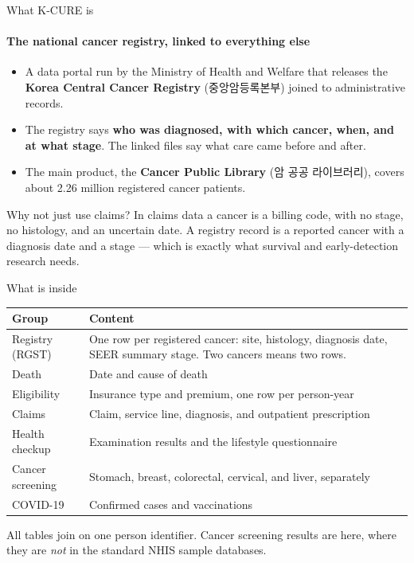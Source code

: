 \documentclass[aspectratio=169,11pt]{beamer}
\newcommand{\hl}[1]{\textbf{\color{kdgreen}#1}}
\newcommand{\han}[1]{{\footnotesize\color{kdgray}(#1)}}
\begin{document}
\begin{frame}{What K-CURE is}
  \framesubtitle{The national cancer registry, linked to everything else}
  \begin{itemize}
    \setlength{\itemsep}{8pt}
    \item A data portal run by the Ministry of Health and Welfare that releases the
          \hl{Korea Central Cancer Registry} \han{중앙암등록본부} joined to administrative records.
    \item The registry says \hl{who was diagnosed, with which cancer, when, and at
          what stage}. The linked files say what care came before and after.
    \item The main product, the \hl{Cancer Public Library} \han{암 공공 라이브러리},
          covers about 2.26 million registered cancer patients.
  \end{itemize}
  \vspace{4pt}
  \begin{block}{Why not just use claims?}
    In claims data a cancer is a billing code, with no stage, no histology, and an
    uncertain date. A registry record is a reported cancer with a diagnosis date
    and a stage --- which is exactly what survival and early-detection research needs.
  \end{block}
\end{frame}

\begin{frame}{What is inside}
  \vspace{2pt}
  \renewcommand{\arraystretch}{1.35}
  {\small
  \begin{tabularx}{\textwidth}{@{}l >{\raggedright\arraybackslash}X@{}}
    \toprule
    \textbf{Group} & \textbf{Content} \\
    \midrule
    Registry \han{RGST} & One row per registered cancer: site, histology, diagnosis date,
      SEER summary stage. Two cancers means two rows. \\
    Death & Date and cause of death \\
    Eligibility & Insurance type and premium, one row per person-year \\
    Claims & Claim, service line, diagnosis, and outpatient prescription \\
    Health checkup & Examination results and the lifestyle questionnaire \\
    Cancer screening & Stomach, breast, colorectal, cervical, and liver, separately \\
    COVID-19 & Confirmed cases and vaccinations \\
    \bottomrule
  \end{tabularx}}
  \vspace{6pt}

  {\small All tables join on one person identifier. Cancer screening results are
  here, where they are \emph{not} in the standard NHIS sample databases.}
\end{frame}
\end{document}
